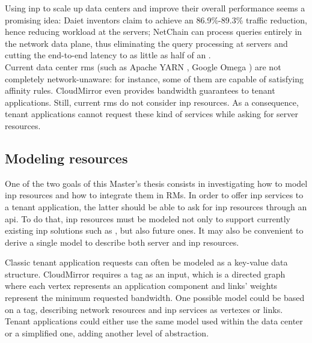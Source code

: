 Using \gls{inp} to scale up data centers and improve their overall performance seems a promising idea: Daiet \cite{daiet} inventors claim to achieve an 86.9\%-89.3\% traffic reduction, hence reducing workload at the servers;
NetChain \cite{netchain} can process queries entirely in the network data plane, thus eliminating the query processing at servers and cutting the end-to-end latency to as little as half of an .\\
Current data center \glspl{rm} (such as Apache YARN \cite{yarn}, Google Omega \cite{omega}) are not completely network-unaware: for instance, some of them are capable of satisfying affinity rules.
CloudMirror \cite{cloudmirror} even provides bandwidth guarantees to tenant applications.
Still, current \glspl{rm} do not consider \gls{inp} resources.
As a consequence, tenant applications cannot request these kind of services while asking for server resources.

\subsection{Modeling \texorpdfstring{}{INP} resources}
One of the two goals of this Master's thesis consists in investigating how to model \gls{inp} resources and how to integrate them in RMs.
In order to offer \gls{inp} services to a tenant application, the latter should be able to ask for \gls{inp} resources through an \gls{api}.
To do that, \gls{inp} resources must be modeled not only to support currently existing \gls{inp} solutions such as \cite{daiet} \cite{netchain} \cite{incbricks} \cite{sharp}, but also future ones. 
It may also be convenient to derive a single model to describe both server and \gls{inp} resources.

Classic tenant application requests can often be modeled as a key-value data structure.
CloudMirror \cite{cloudmirror} requires a \gls{tag} as an input, which is a directed graph where each vertex represents an application component and links' weights represent the minimum requested bandwidth.
One possible model could be based on a \gls{tag}, describing network resources and \gls{inp} services as vertexes or links.
Tenant applications could either use the same model used within the data center or a simplified one, adding another level of abstraction.

